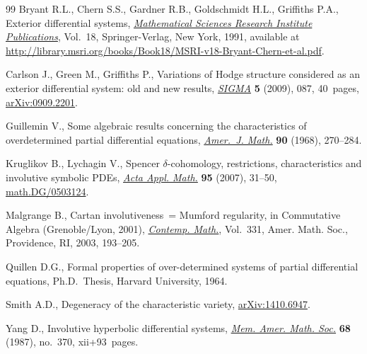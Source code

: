 \documentclass[11pt]{article}
\numberwithin{equation}{section}
\begin{document}
\begin{thebibliography}{99}
Bryant R.L., Chern S.S., Gardner R.B., Goldschmidt H.L., Grif\/f\/iths P.A.,
  Exterior dif\/ferential systems, \href{http://dx.doi.org/10.1007/978-1-4613-9714-4}{\textit{Mathematical Sciences Research
  Institute Publications}}, Vol.~18, Springer-Verlag, New York, 1991, available at
\url{http://library.msri.org/books/Book18/MSRI-v18-Bryant-Chern-et-al.pdf}.

Carlson J., Green M., Grif\/f\/iths P., Variations of {H}odge structure considered
  as an exterior dif\/ferential system: old and new results, \href{http://dx.doi.org/10.3842/SIGMA.2009.087}{\textit{SIGMA}}
  \textbf{5} (2009), 087, 40~pages, \href{http://arxiv.org/abs/0909.2201}{arXiv:0909.2201}.

Guillemin V., Some algebraic results concerning the characteristics of
  overdetermined partial dif\/ferential equations, \href{http://dx.doi.org/10.2307/2373436}{\textit{Amer.~J. Math.}}
  \textbf{90} (1968), 270--284.

Kruglikov B., Lychagin V., Spencer {$\delta$}-cohomology, restrictions,
  characteristics and involutive symbolic {PDE}s, \href{http://dx.doi.org/10.1007/s10440-006-9080-z}{\textit{Acta Appl. Math.}}
  \textbf{95} (2007), 31--50, \href{http://arxiv.org/abs/math.DG/0503124}{math.DG/0503124}.

Malgrange B., Cartan involutiveness~= {M}umford regularity, in Commutative
  Algebra ({G}renoble/{L}yon, 2001), \href{http://dx.doi.org/10.1090/conm/331/05911}{\textit{Contemp. Math.}}, Vol.~331, Amer.
  Math. Soc., Providence, RI, 2003, 193--205.

Quillen D.G., Formal properties of over-determined systems of partial
  dif\/ferential equations, Ph.D.~Thesis, Harvard University, 1964.

Smith A.D., Degeneracy of the characteristic variety, \href{http://arxiv.org/abs/1410.6947}{arXiv:1410.6947}.

Yang D., Involutive hyperbolic dif\/ferential systems, \href{http://dx.doi.org/10.1090/memo/0370}{\textit{Mem. Amer. Math.
  Soc.}} \textbf{68} (1987), no.~370, xii+93~pages.

\end{thebibliography}
\end{document}
